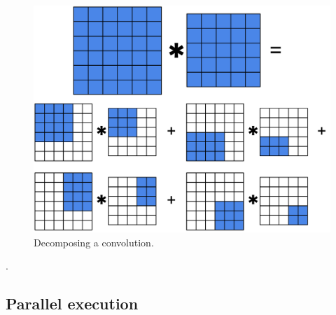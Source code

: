 
  \begin{figure}
    \begin{center}
      \includegraphics[width=0.67\linewidth]{fig/decomposition}
    \end{center}
    \caption{Decomposing a convolution.}
    \label{fig:conv-decomposition}
  \end{figure}



  .




  \subsection{Parallel execution}
